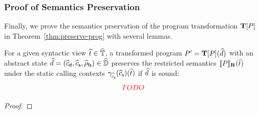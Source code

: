 \documentclass[10pt,conference]{IEEEtran}
\begin{document}
\subsubsection{Proof of Semantics Preservation} Finally, we prove the semantics
prservation of the program transformation $\textbf{T}[P]$ in
Theorem~\ref{thm:preserve-prog} with several lemmas.

\begin{theorem}
  \label{thm:preserve-prog}
  For a given syntactic view $\widehat{t} \in \widehat{\mathbb{T}}$, a transformed program
  $P' = \textbf{T}[P](\widehat{d})$ with an abstract state $\widehat{d} =
  (\widehat{c}_{\textsf{d}}, \widehat{c}_{\textsf{s}}, \widehat{\rho}_{\textsf{fs}}) \in \widehat{\mathbb{D}}$ preserves the restricted semantics
  $\llbracket{P}\rrbracket_\textbf{R}(\widehat{t})$ under the static calling contexts
  $\gamma_{\widehat{c}_{\textsf{s}}}(\widehat{c}_{\textsf{s}})(\widehat{t})$ if $\widehat{d}$ is sound:
  \[
    {\color{red}{TODO}}
  \]
\end{theorem}
\begin{proof}
  \todo
\end{proof}

\balance

\end{document}
